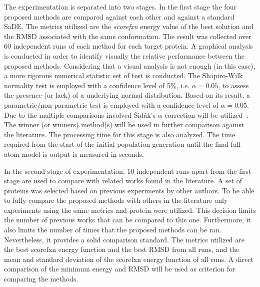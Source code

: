 The experimentation is separated into two stages. In the first stage the four proposed methods are compared against each other and against a standard \ac{SaDE}. The metrics utilized are the \textit{scorefxn} energy value of the best solution and the \ac{RMSD} associated with the same conformation.
The result was collected over 60 independent runs of each method for each target protein. A graphical analysis is conducted
in order to identify visually the relative performance between the proposed methods.
Considering that a visual analysis is not enough (in this case), a more rigorous numerical
statistic set of test is conducted.
The Shapiro-Wilk~\cite{wilk1968joint} normality test is employed with a confidence level of 5\%, i.e. $\alpha = 0.05$,
to assess the presence (or lack) of a underlying normal distribution. Based on its result, 
a parametric/non-parametric test is employed with a confidence level of $\alpha = 0.05$. Due to the multiple
comparisons involved \v{S}idák's $\alpha$ correction will be utilized~\cite{vsidak1967rectangular}.
The winner (or winners) method(s) will be used in further comparison against the literature.
The processing time for this stage is also analyzed. The time required from the start of the 
initial population generation until the final full atom model is output is measured in seconds.

In the second stage of experimentation, 10 independent runs apart from the first stage are used to compare with related works found in the literature. A set of proteins was selected based on previous experiments by other authors. To be able to fully compare the proposed methods with others in the literature only experiments using the same metrics and protein were utilized. This decision limits the number of previous works that can be compared to this one. Furthermore, it also limits the number of times that the proposed methods can be ran. Nevertheless, it provides a solid comparison standard. The metrics utilized are the best scorefxn energy function and the best \ac{RMSD} from all runs, and the mean and standard deviation of the scorefxn energy function of all runs. A direct comparison of the minimum energy and \ac{RMSD} will be used as criterion for comparing the methods. %
%

